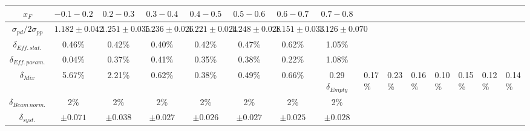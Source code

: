 \begin{tabular}{c|ccccccc}
\hline
$x_F$                      & $-0.1-0.2$      & $0.2-0.3$       & $0.3-0.4$       & $0.4-0.5$       & $0.5-0.6$       & $0.6-0.7$       & $0.7-0.8$       \\ \hline
$\sigma_{pd}/2\sigma_{pp}$ & $1.182\pm0.042$ & $1.251\pm0.035$ & $1.236\pm0.026$ & $1.221\pm0.024$ & $1.248\pm0.028$ & $1.151\pm0.033$ & $1.126\pm0.070$ \\ \hline
$\delta_{Eff.\,stat.}$     & 0.46\%          & 0.42\%          & 0.40\%          & 0.42\%          & 0.47\%          & 0.62\%          & 1.05\%          \\
$\delta_{Eff.\,param.}$    & 0.04\%          & 0.37\%          & 0.41\%          & 0.35\%          & 0.38\%          & 0.22\%          & 1.08\%          \\
$\delta_{Mix}$             & 5.67\%          & 2.21\%          & 0.62\%          & 0.38\%          & 0.49\%          & 0.66\%          & 0.29%
$\delta_{Empty}$           & 0.17\%          & 0.23\%          & 0.16\%          & 0.10\%          & 0.15\%          & 0.12\%          & 0.14\%          \\
$\delta_{Beam\,norm.}$     & 2\%             & 2\%             & 2\%             & 2\%             & 2\%             & 2\%             & 2\%             \\ \hline
$\delta_{syst.}$           & $\pm0.071$      & $\pm0.038$      & $\pm0.027$      & $\pm0.026$      & $\pm0.027$      & $\pm0.025$      & $\pm0.028$      \\ \hline
\end{tabular}
